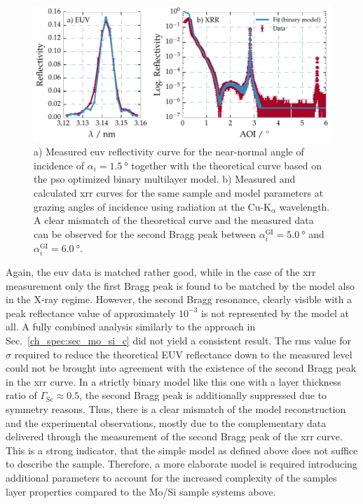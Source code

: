 \begin{figure}[htbp]
  \centering
  \includegraphics[width=\textwidth]{img/CrSc_binary_model_EUV_vs_XRR}
  \caption[Comparison of EUV and XRR fitting results for the binary Cr/Sc model approach.]{a) Measured \gls{euv} reflectivity curve for the near-normal angle of incidence of $\alpha_i=\SI{1.5}{\degree}$ together with the theoretical curve based on the \gls{pso} optimized binary multilayer model. b) Measured and calculated \gls{xrr} curves for the same sample and model parameters at grazing angles of incidence using radiation at the Cu-K$_\alpha$ wavelength. A clear mismatch of the theoretical curve and the measured data can be observed for the second Bragg peak between $\alpha_i^\text{GI} = \SI{5.0}{\degree}$ and $\alpha_i^\text{GI} = \SI{6.0}{\degree}$.}
  \label{ch_spec:fig_CrSc_binary_model_EUV_vs_XRR}
\end{figure}

Again, the \gls{euv} data is matched rather good, while in the case of the \gls{xrr} measurement only the first Bragg peak is found to be matched by the model also in the X-ray regime. However, the second Bragg resonance, clearly visible with a peak reflectance value of approximately $10^{-3}$ is not represented by the model at all. A fully
combined analysis similarly to the approach in Sec.~\ref{ch_spec:sec_mo_si_c} did not yield a consistent result. The \gls{rms} value for $\sigma$ required to reduce the theoretical EUV reflectance down to the measured 
level could not be brought into agreement with the existence of the second Bragg peak in the \gls{xrr} curve. In a strictly binary model like this one with a layer thickness ratio of 
$\Gamma_\text{Sc}\approx 0.5$, the second Bragg peak is additionally suppressed 
due to symmetry reasons. Thus, there is a clear mismatch of the model reconstruction and the experimental observations, mostly due to the complementary data delivered through the measurement of the second Bragg peak of the \gls{xrr} curve. This is a strong indicator, that the simple model as defined above does not suffice to describe the sample. Therefore, a more elaborate model is required introducing additional parameters to account for the increased complexity of the samples layer properties compared to the Mo/Si sample systems above.


